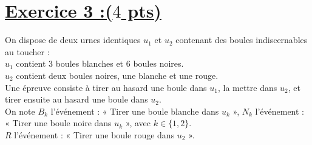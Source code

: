 \documentclass[12pt,a4paper]{article}
\begin{document}
\section*{\underline{Exercice 3 :($4$ pts)} }

On dispose de deux urnes identiques \( u_1 \) et \( u_2 \) contenant des boules indiscernables au toucher :\\
\( u_1 \) contient 3 boules blanches et 6 boules noires.\\
\( u_2 \) contient deux boules noires, une blanche et une rouge.\\

Une épreuve consiste à tirer au hasard une boule dans \( u_1 \), la mettre dans \( u_2 \), et tirer ensuite au hasard une boule dans \( u_2 \).\\
On note \( B_k \) l'événement : « Tirer une boule blanche dans \( u_k \) », \( N_k \) l'événement : « Tirer une boule noire dans \( u_k \) », avec \( k\in \{ 1,2 \} \).\\
\( R \) l'événement : « Tirer une boule rouge dans \( u_2 \) ».
\end{document}
